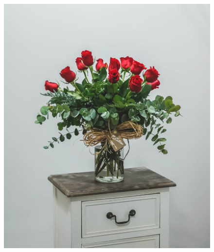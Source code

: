 \begin{figure}
\begin{minipage}{0.3\textwidth}
 \caption{ }
 \label{fig:6}
\end{minipage}
\end{figure}

\begin{figure}
\centering
\begin{minipage}{0.3\textwidth}%
 \includegraphics[width=\textwidth]{Graphics/Images/image_7.jpg}
 \caption{ }
 \label{fig:7}
\end{minipage}%
\begin{minipage}{0.3\textwidth}

\end{minipage}
\end{figure}
